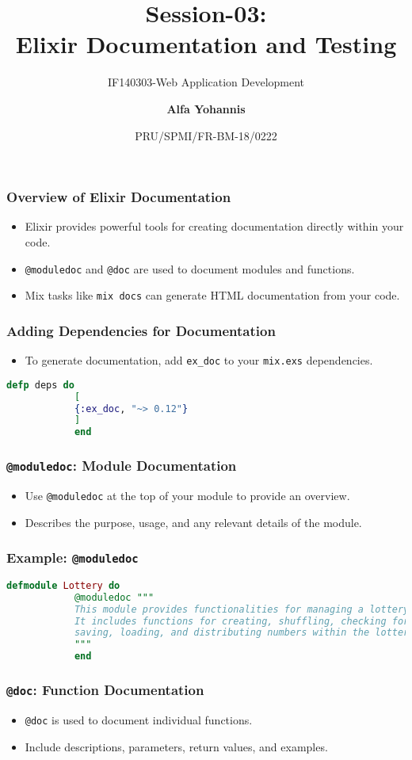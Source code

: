 \documentclass[aspectratio=169, table]{beamer}
\subtitle{IF140303-Web Application Development}
\title{\LARGE{Session-03:\\ Elixir Documentation and Testing}
	\vspace{20pt}}
\date[Serial]{\scriptsize {PRU/SPMI/FR-BM-18/0222}}
\author[Pradita]{\small{\textbf{Alfa Yohannis}}}
\begin{document}
	
	\frame{\titlepage}
	
	\begin{frame}
		\frametitle{Overview of Elixir Documentation}
		\begin{itemize}
			\item Elixir provides powerful tools for creating documentation directly within your code.
			\item \texttt{@moduledoc} and \texttt{@doc} are used to document modules and functions.
			\item Mix tasks like \texttt{mix docs} can generate HTML documentation from your code.
		\end{itemize}
	\end{frame}
	
	\begin{frame}[fragile]
		\frametitle{Adding Dependencies for Documentation}
		\begin{itemize}
			\item To generate documentation, add \texttt{ex\_doc} to your \texttt{mix.exs} dependencies.
		\end{itemize}
		\begin{lstlisting}[language=Elixir]
			defp deps do
			[
			{:ex_doc, "~> 0.12"}
			]
			end
		\end{lstlisting}
	\end{frame}
	
	\begin{frame}
		\frametitle{\texttt{@moduledoc}: Module Documentation}
		\begin{itemize}
			\item Use \texttt{@moduledoc} at the top of your module to provide an overview.
			\item Describes the purpose, usage, and any relevant details of the module.
		\end{itemize}
	\end{frame}
	
	\begin{frame}[fragile]
		\frametitle{Example: \texttt{@moduledoc}}
		\begin{lstlisting}[language=Elixir]
			defmodule Lottery do
			@moduledoc """
			This module provides functionalities for managing a lottery system.
			It includes functions for creating, shuffling, checking for numbers,
			saving, loading, and distributing numbers within the lottery pool.
			"""
			end
		\end{lstlisting}
	\end{frame}
	
	\begin{frame}
		\frametitle{\texttt{@doc}: Function Documentation}
		\begin{itemize}
			\item \texttt{@doc} is used to document individual functions.
			\item Include descriptions, parameters, return values, and examples.
		\end{itemize}
	\end{frame}
	
\end{document}
